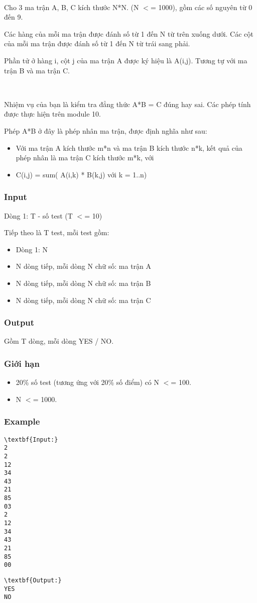 

 

Cho 3 ma trận A, B, C kích thước N*N. (N $<$= 1000), gồm các số nguyên từ 0 đến 9.

Các hàng của mỗi ma trận được đánh số từ 1 đến N từ trên xuống dưới. Các cột của mỗi ma trận được đánh số từ 1 đến N từ trái sang phải.

Phần tử ở hàng i, cột j của ma trận A được ký hiệu là A(i,j). Tương tự với ma trận B và ma trận C.

 

Nhiệm vụ của bạn là kiểm tra đẳng thức A*B = C đúng hay sai. Các phép tính được thực hiện trên module 10.

Phép A*B ở đây là phép nhân ma trận, được định nghĩa như sau:
\begin{itemize}
	\item Với ma trận A kích thước m*n và ma trận B kích thước n*k, kết quả của phép nhân là ma trận C kích thước m*k, với
	\item C(i,j) = sum( A(i,k) * B(k,j) với k = 1..n)
\end{itemize}

\subsubsection{Input}

Dòng 1: T - số test (T $<$= 10)

Tiếp theo là T test, mỗi test gồm:
\begin{itemize}
	\item Dòng 1: N
	\item N dòng tiếp, mỗi dòng N chữ số: ma trận A
	\item N dòng tiếp, mỗi dòng N chữ số: ma trận B
	\item N dòng tiếp, mỗi dòng N chữ số: ma trận C
\end{itemize}

\subsubsection{Output}

Gồm T dòng, mỗi dòng YES / NO.

\subsubsection{Giới hạn}
\begin{itemize}
	\item 20\% số test (tương ứng với 20\% số điểm) có N $<$= 100.
	\item N $<$= 1000.
\end{itemize}

\subsubsection{Example}
\begin{verbatim}
\textbf{Input:}
2
2
12
34
43
21
85
03
2
12
34
43
21
85
00\end{verbatim}
\begin{verbatim}
\textbf{Output:}
YES
NO\end{verbatim}